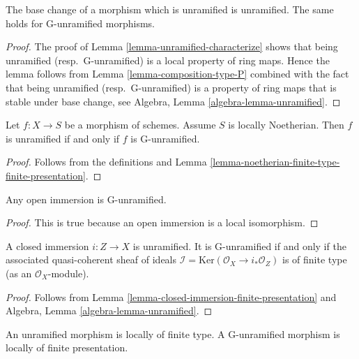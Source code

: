 \begin{lemma}
\label{lemma-base-change-unramified}
The base change of a morphism which is unramified is unramified.
The same holds for G-unramified morphisms.
\end{lemma}

\begin{proof}
The proof of Lemma \ref{lemma-unramified-characterize}
shows that being unramified (resp.\ G-unramified)
is a local property of ring maps. Hence the lemma follows from
Lemma \ref{lemma-composition-type-P} combined
with the fact that being unramified (resp.\ G-unramified)
is a property of ring maps that is stable under base change, see
Algebra, Lemma \ref{algebra-lemma-unramified}.
\end{proof}

\begin{lemma}
\label{lemma-noetherian-unramfied}
Let $f : X \to S$ be a morphism of schemes. Assume $S$ is locally Noetherian.
Then $f$ is unramified if and only if $f$ is G-unramified.
\end{lemma}

\begin{proof}
Follows from the definitions and
Lemma \ref{lemma-noetherian-finite-type-finite-presentation}.
\end{proof}


\begin{lemma}
\label{lemma-open-immersion-unramified}
Any open immersion is G-unramified.
\end{lemma}

\begin{proof}
This is true because an open immersion is a local isomorphism.
\end{proof}

\begin{lemma}
\label{lemma-closed-immersion-unramified}
A closed immersion $i : Z \to X$ is unramified.
It is G-unramified if and only if the associated quasi-coherent sheaf of
ideals $\mathcal{I} = \text{Ker}(\mathcal{O}_X \to i_*\mathcal{O}_Z)$
is of finite type (as an $\mathcal{O}_X$-module).
\end{lemma}

\begin{proof}
Follows from Lemma \ref{lemma-closed-immersion-finite-presentation} and
Algebra, Lemma \ref{algebra-lemma-unramified}.
\end{proof}

\begin{lemma}
\label{lemma-unramified-locally-finite-type}
An unramified morphism is locally of finite type.
A G-unramified morphism is locally of finite presentation.
\end{lemma}

